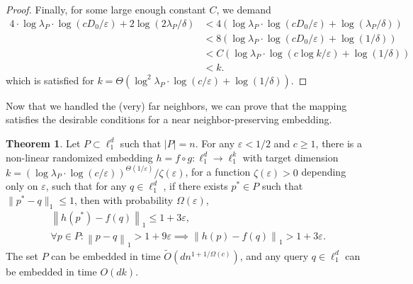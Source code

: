 \documentclass[10pt,a4paper,twoside]{book}
\newcommand{\eps}{\varepsilon}
\newcommand{\norm}[1]{\left \rVert {#1} \right \rVert}
\theoremstyle{definition}
\newtheorem{theorem}[definition]{Theorem}
\theoremstyle{remark}
\begin{document}
\begin{proof}
Finally, for some large enough constant $C$, we demand
\begin{align*}
    4 \cdot \log{\lambda_P} \cdot \log(c D_0/ \eps)+2 \log (2 \lambda_P/\delta) &< 4( \log{\lambda_P} \cdot \log(c D_0/ \eps)+ \log ( \lambda_P/\delta) ) \\
    &< 8( \log{\lambda_P} \cdot \log(c D_0/ \eps)+ \log ( 1/\delta) ) \\
    &< C( \log{\lambda_P} \cdot \log(c \log k/ \eps)+ \log ( 1/\delta) ) \\
    &< k.
\end{align*}
which is satisfied for $k = \Theta \left( \log^{2}{\lambda_P} \cdot \log ( c / \eps) + \log (1/ \delta) \right)$.
\end{proof}

Now that we handled the (very) far neighbors, we can prove that the mapping satisfies the desirable conditions for a near neighbor-preserving embedding.
\begin{theorem}
\label{theorem:main}
Let $P \subset \ell_1^d$ such that $|P|=n$. For any $\eps < 1/2$ and $c \geq 1$, there is a non-linear randomized embedding $h = f \circ g: \ell_1^d \rightarrow \ell_1^k$ with target dimension $k = \left( \log{\lambda_P} \cdot \log(c / \eps) \right)^{\Theta(1/\eps)} / \zeta(\eps) $, for a function $\zeta(\eps)>0$ depending only on $\eps$, such that for any  $q \in \ell_1^d$ , if there exists $p^{*}\in P$ such that $\|p^{*}-q\|_1 \leq 1$, then with probability $\Omega(\eps)$,
\begin{align*}
    &\norm{h(p^{*}) - f(q)}_1 \leq 1 + 3\eps, \\
    &\forall p\in P: \norm{p-q}_1 > 1+9\eps \implies \norm{h(p) - f(q)}_1 > 1 + 3\eps.
\end{align*}
The set $P$ can be embedded in time $\tilde{O}(d n^{1+1/ \Omega(c)})$, and any query $q\in \ell_1^d$ can be embedded in time $O(dk)$.
\end{theorem}
\end{document}
